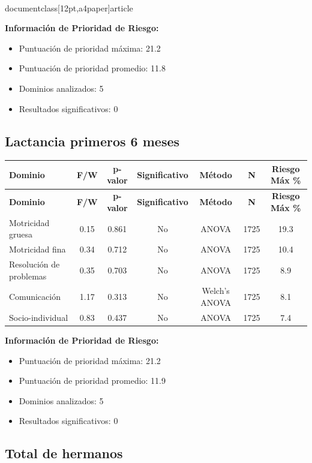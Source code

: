 \\documentclass[12pt,a4paper]{article}
\begin{document}
\textbf{Información de Prioridad de Riesgo:}
\begin{itemize}
\item Puntuación de prioridad máxima: 21.2
\item Puntuación de prioridad promedio: 11.8
\item Dominios analizados: 5
\item Resultados significativos: 0
\end{itemize}


\subsection{Lactancia primeros 6 meses}


\begin{longtable}{|l|c|c|c|c|c|c|}
\hline
\textbf{Dominio} & \textbf{F/W} & \textbf{p-valor} & \textbf{Significativo} & \textbf{Método} & \textbf{N} & \textbf{Riesgo Máx \%} \\
\hline
\endfirsthead

\hline
\textbf{Dominio} & \textbf{F/W} & \textbf{p-valor} & \textbf{Significativo} & \textbf{Método} & \textbf{N} & \textbf{Riesgo Máx \%} \\
\hline
\endhead

\hline
\endfoot

\hline
\endlastfoot

Motricidad gruesa & 0.15 & 0.861 & No & ANOVA & 1725 & 19.3 \\
Motricidad fina & 0.34 & 0.712 & No & ANOVA & 1725 & 10.4 \\
Resolución de problemas & 0.35 & 0.703 & No & ANOVA & 1725 & 8.9 \\
Comunicación & 1.17 & 0.313 & No & Welch's ANOVA & 1725 & 8.1 \\
Socio-individual & 0.83 & 0.437 & No & ANOVA & 1725 & 7.4 \\

\end{longtable}


\textbf{Información de Prioridad de Riesgo:}
\begin{itemize}
\item Puntuación de prioridad máxima: 21.2
\item Puntuación de prioridad promedio: 11.9
\item Dominios analizados: 5
\item Resultados significativos: 0
\end{itemize}


\subsection{Total de hermanos}
\end{document}
